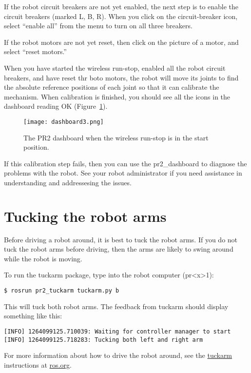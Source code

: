 If the robot circuit breakers are not yet enabled, the next step is to enable the circuit breakers (marked L, B, R).  When you click on the circuit-breaker icon, select ``enable all'' from the menu to turn on all three breakers.

If the robot motors are not yet reset, then click on the picture of a motor, and 
select ``reset motors.''  

When you have started the wireless run-stop, enabled all the robot circuit breakers, and have reset thr boto motors, the robot will move its joints to find the absolute reference positions of each joint so that it can calibrate the mechanism.  When calibration is finished, you should see all the icons in the dashboard reading OK (Figure~\ref{fig:dashboard3}).

\begin{figure}[h]
\centering
\texttt{[image: dashboard3.png]}
\caption{The PR2 dashboard when the wireless run-stop is in the start position.}
\label{fig:dashboard3}
\end{figure}

If this calibration step fails, then you can use the pr2\_dashboard to diagnose the problems with the robot. See your robot administrator if you need assistance in understanding and addressesing the issues.

\section{Tucking the robot arms}

Before driving a robot around, it is best to tuck the robot arms. If you do not tuck the robot arms before driving, then the arms are likely to swing around while the robot is moving.

To run the tuckarm package, type into the robot computer (pr\textless x\textgreater 1):
\begin{verbatim}
$ rosrun pr2_tuckarm tuckarm.py b
\end{verbatim}
This will tuck both robot arms. The feedback from tuckarm should display something like this:
\begin{verbatim}
[INFO] 1264099125.710039: Waiting for controller manager to start
[INFO] 1264099125.718283: Tucking both left and right arm
\end{verbatim}

For more information about how to drive the robot around, see the 
\href{http://www.ros.org/wiki/pr2_tuckarm}{tuckarm} instructions at \href{http://www.ros.org}{ros.org}.

